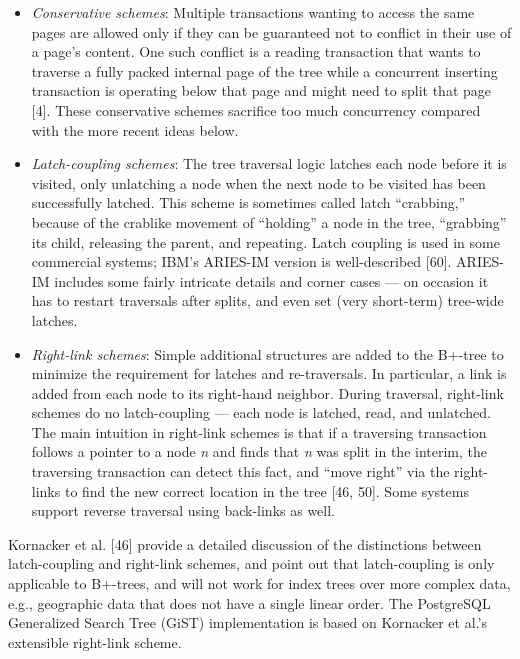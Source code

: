 \documentclass[a4paper,11pt,twoside,openright]{book}
\begin{document}
\begin{itemize}
\item
  \emph{Conservative schemes}: Multiple transactions wanting to access
  the same pages are allowed only if they can be guaranteed not to
  conflict in their use of a page's content. One such conflict is a
  reading transaction that wants to traverse a fully packed internal
  page of the tree while a concurrent inserting transaction is operating
  below that page and might need to split that page {[}4{]}. These
  conservative schemes sacrifice too much concurrency compared with the
  more recent ideas below.
\item
  \emph{Latch-coupling schemes}: The tree traversal logic latches each
  node before it is visited, only unlatching a node when the next node
  to be visited has been successfully latched. This scheme is sometimes
  called latch ``crabbing,'' because of the crablike movement of
  ``holding'' a node in the tree, ``grabbing'' its child, releasing the
  parent, and repeating. Latch coupling is used in some commercial
  systems; IBM's ARIES-IM version is well-described {[}60{]}. ARIES-IM
  includes some fairly intricate details and corner cases --- on
  occasion it has to restart traversals after splits, and even set (very
  short-term) tree-wide latches.
\end{itemize}

\begin{itemize}

\item
  \emph{Right-link schemes}: Simple additional structures are added to
  the B+-tree to minimize the requirement for latches and re-traversals.
  In particular, a link is added from each node to its right-hand
  neighbor. During traversal, right-link schemes do no latch-coupling
  --- each node is latched, read, and unlatched. The main intuition in
  right-link schemes is that if a traversing transaction follows a
  pointer to a node \emph{n} and finds that \emph{n} was split in the
  interim, the traversing transaction can detect this fact, and ``move
  right'' via the right-links to find the new correct location in the
  tree {[}46, 50{]}. Some systems support reverse traversal using
  back-links as well.
\end{itemize}

Kornacker et al. {[}46{]} provide a detailed discussion of the
distinctions between latch-coupling and right-link schemes, and point
out that latch-coupling is only applicable to B+-trees, and will not
work for index trees over more complex data, e.g., geographic data that
does not have a single linear order. The PostgreSQL Generalized Search
Tree (GiST) implementation is based on Kornacker et al.'s extensible
right-link scheme.
\end{document}
